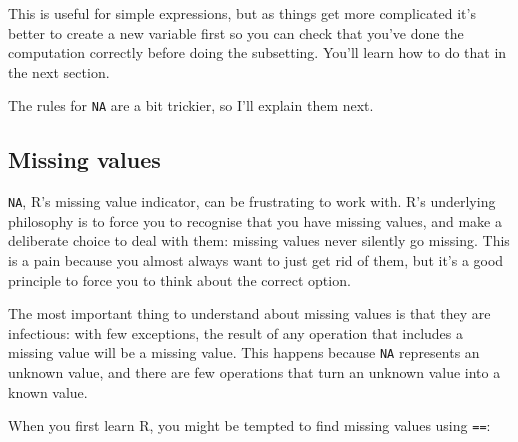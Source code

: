 This is useful for simple expressions, but as things get more
complicated it's better to create a new variable first so you can check
that you've done the computation correctly before doing the subsetting.
You'll learn how to do that in the next section.

The rules for \texttt{NA} are a bit trickier, so I'll explain them next.

\subsection{Missing values}

\texttt{NA}, R's missing value indicator, can be frustrating to work
with. R's underlying philosophy is to force you to recognise that you
have missing values, and make a deliberate choice to deal with them:
missing values never silently go missing. This is a pain because you
almost always want to just get rid of them, but it's a good principle to
force you to think about the correct option. 

The most important thing to understand about missing values is that they
are infectious: with few exceptions, the result of any operation that
includes a missing value will be a missing value. This happens because
\texttt{NA} represents an unknown value, and there are few operations
that turn an unknown value into a known value.

\begin{Shaded}
\begin{Highlighting}[]
\StringTok{ }\NormalTok{(}\NormalTok{, }\NormalTok{, }\NormalTok{)}
\StringTok{ }
\StringTok{ }
\StringTok{ }
\end{Highlighting}
\end{Shaded}

When you first learn R, you might be tempted to find missing values
using \texttt{==}:

\begin{Shaded}
\begin{Highlighting}[]
\StringTok{ }
\StringTok{ }
\end{Highlighting}
\end{Shaded}

